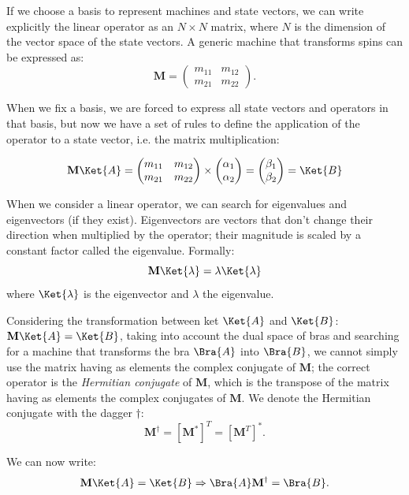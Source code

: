 If we choose a basis to represent machines and state vectors, we can write explicitly the linear operator as an $N\times N$ matrix, where $N$ is the dimension of the vector space of the state vectors. A generic machine that transforms spins can be expressed as:
\[
\mathbf{M} = \begin{pmatrix}
	m_{11} &  m_{12}\\
	m_{21} &  m_{22}
\end{pmatrix}.
\]

When we fix a basis, we are forced to express all state vectors and operators in that basis, but now we have a set of rules to define the application of the operator to a state vector, i.e. the matrix multiplication:

\[
\mathbf{M} \Ket{A} = 
\begin{pmatrix}
	m_{11} &  m_{12}\\
	m_{21} &  m_{22}
\end{pmatrix}
\times
\begin{pmatrix}
	\alpha_{1}\\
	\alpha_{2}
\end{pmatrix}
=
\begin{pmatrix}
	\beta_{1}\\
	\beta_{2}
\end{pmatrix}
=\Ket{B}
\]

When we consider a linear operator, we can search for eigenvalues and eigenvectors (if they exist). Eigenvectors are vectors that don't change their direction when multiplied by the operator; their magnitude is scaled by a constant factor called the eigenvalue. Formally:
\[
\mathbf{M}\Ket{\lambda} = \lambda\Ket{\lambda}
\]
where $\Ket{\lambda}$ is the eigenvector and $\lambda$ the eigenvalue.

Considering the transformation between ket $\Ket{A}$ and $\Ket{B}$: $\mathbf{M} \Ket{A} = \Ket{B}$, taking into account the dual space of bras and searching for a machine that transforms the bra $\Bra{A}$ into $\Bra{B}$, we cannot simply use the matrix having as elements the complex conjugate of $\mathbf{M}$; the correct operator is the \emph{Hermitian conjugate} of $\mathbf{M}$, which is the transpose of the matrix having as elements the complex conjugates of $\mathbf{M}$. We denote the Hermitian conjugate with the dagger $\dagger$:
\[
\mathbf{M}^\dagger =  [\mathbf{M}^*]^T = [\mathbf{M}^T]^*.
\]

We can now write:
\[
\mathbf{M}\Ket{A} = \Ket{B} \Rightarrow \Bra{A}\mathbf{M}^\dagger = \Bra{B}.
\]

